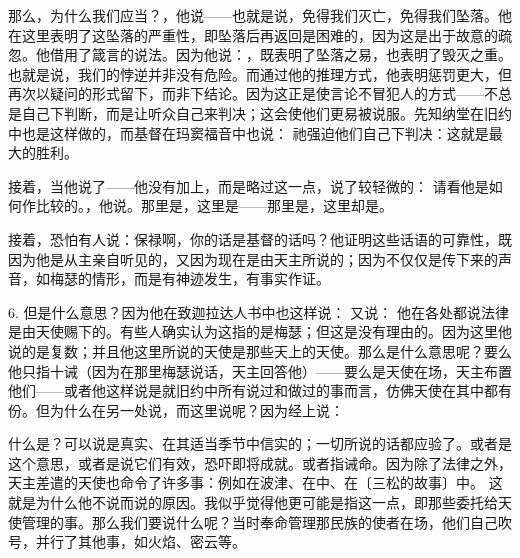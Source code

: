 那么，为什么我们应当？，他说——也就是说，免得我们灭亡，免得我们坠落。他在这里表明了这坠落的严重性，即坠落后再返回是困难的，因为这是出于故意的疏忽。他借用了箴言的说法。因为他说：，既表明了坠落之易，也表明了毁灭之重。也就是说，我们的悖逆并非没有危险。而通过他的推理方式，他表明惩罚更大，但再次以疑问的形式留下，而非下结论。因为这正是使言论不冒犯人的方式——不总是自己下判断，而是让听众自己来判决；这会使他们更易被说服。先知纳堂在旧约中也是这样做的，而基督在玛窦福音中也说： 祂强迫他们自己下判决：这就是最大的胜利。\par

接着，当他说了——他没有加上，而是略过这一点，说了较轻微的： 请看他是如何作比较的。，他说。那里是，这里是——那里是，这里却是。\par

接着，恐怕有人说：保禄啊，你的话是基督的话吗？他证明这些话语的可靠性，既因为他是从主亲自听见的，又因为现在是由天主所说的；因为不仅仅是传下来的声音，如梅瑟的情形，而是有神迹发生，有事实作证。\par

6. 但是什么意思？因为他在致迦拉达人书中也这样说： 又说： 他在各处都说法律是由天使赐下的。有些人确实认为这指的是梅瑟；但这是没有理由的。因为这里他说的是复数；并且他这里所说的天使是那些天上的天使。那么是什么意思呢？要么他只指十诫（因为在那里梅瑟说话，天主回答他）——要么是天使在场，天主布置他们——或者他这样说是就旧约中所有说过和做过的事而言，仿佛天使在其中都有份。但为什么在另一处说，而这里说呢？因为经上说：\par

 什么是？可以说是真实、在其适当季节中信实的；一切所说的话都应验了。或者是这个意思，或者是说它们有效，恐吓即将成就。或者指诫命。因为除了法律之外，天主差遣的天使也命令了许多事：例如在波津、在中、在〔三松的故事〕中。 这就是为什么他不说而说的原因。我似乎觉得他更可能是指这一点，即那些委托给天使管理的事。那么我们要说什么呢？当时奉命管理那民族的使者在场，他们自己吹号，并行了其他事，如火焰、密云等。\par

